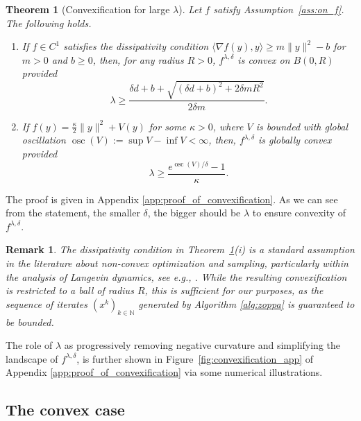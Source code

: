 \documentclass{article}
\newtheorem{theorem}{Theorem}
\newtheorem{remark}{Remark}
\newcommand{\osc}{\ensuremath{\operatorname{osc}}}
\begin{document}
\begin{theorem}[Convexification for large $\lambda$]\label{thm:convexification}
Let $f$ satisfy Assumption~\ref{ass:on_f}. The following holds.
\begin{enumerate}
    \item[(i)] If $f\in C^1$ satisfies the dissipativity condition $\langle \nabla f(y), y \rangle \geq m\|y\|^2 - b$ for $m > 0$ and $b \geq 0$, then, for any radius $R > 0$, $f^{\lambda,\delta}$ is convex on $B(0, R)$ provided
    \begin{equation}
        \lambda \geq \frac{\delta d + b + \sqrt{(\delta d + b)^2 + 2\delta m R^2}}{2\delta m}.
    \end{equation}
        \item[(ii)] If $f(y) = \frac{\kappa}{2}\|y\|^2 + V(y)$ for some $\kappa > 0$, where $V$ is bounded with global oscillation $\operatorname{osc}(V) := \sup V - \inf V < \infty$, then, $f^{\lambda,\delta}$ is globally convex provided
\begin{equation}
        \lambda \geq \frac{e^{\osc(V)/\delta}-1}{\kappa}.
    \end{equation}
\end{enumerate}
\end{theorem}
    The proof is given in Appendix \ref{app:proof_of_convexification}.
As we can see from the statement, the smaller $\delta$, the bigger should be $\lambda$ to ensure convexity of $f^{\lambda,\delta}$.
\begin{remark} 
    The dissipativity condition in Theorem~\ref{thm:convexification}(i) is a standard assumption in the literature about non-convex optimization and sampling, particularly within the analysis of Langevin dynamics, see e.g., \cite{Raginsky2017, XCZG2018}. While the resulting convexification is restricted to a ball of radius $R$, this is sufficient for our purposes, as the sequence of iterates $(x^k)_{k\in\mathbb{N}}$ generated by Algorithm \ref{alg:zoppa} is guaranteed to be bounded.
\end{remark}

The role of $\lambda$ as progressively removing negative curvature and simplifying the landscape of $f^{\lambda,\delta}$, is further shown in Figure~\ref{fig:convexification_app} of Appendix \ref{app:proof_of_convexification} via some numerical illustrations.

\subsection{The convex case}
\end{document}
